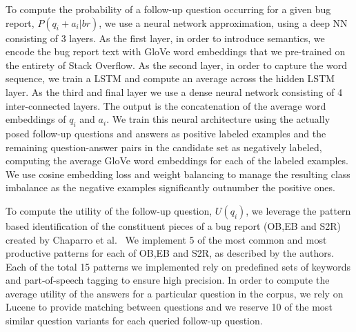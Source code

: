 To compute the probability of a follow-up question occurring for a given bug report, $P(q_{i}+a_{i}|br)$, we use a neural
network approximation, using a deep NN consisting of 3 layers. As the first layer, in order to introduce semantics, we encode
the bug report text with GloVe word embeddings that we pre-trained on the entirety of Stack Overflow. As the second layer, in order to capture the word sequence, we train a LSTM and compute an average across the hidden LSTM layer. As the third and final layer we use a dense neural network consisting of 4 inter-connected layers. The output is the concatenation of the average word embeddings of $q_{i}$ and $a_{i}$. We train this neural architecture using the actually posed follow-up questions and answers as positive labeled examples and the remaining question-answer pairs in the candidate set as negatively labeled, computing the average GloVe word embeddings for each of the labeled examples. We use cosine embedding loss and weight balancing to manage the resulting class imbalance as the negative examples significantly outnumber the positive ones.

To compute the utility of the follow-up question, $U(q_{i})$, we leverage the pattern based
identification of the constituent pieces of a bug report (OB,EB and S2R) created by Chaparro et al.~\cite{chaparro17detecting}
We implement 5 of the most common and most productive patterns for each of OB,EB and S2R, as described by
the authors. Each of the total 15 patterns we implemented rely on predefined sets of keywords and part-of-speech tagging to ensure high
precision. In order to compute the average utility of the answers for a particular question in the corpus, we rely on Lucene to provide
matching between questions and we reserve 10 of the most similar question variants for each queried follow-up question.


%
%
%
